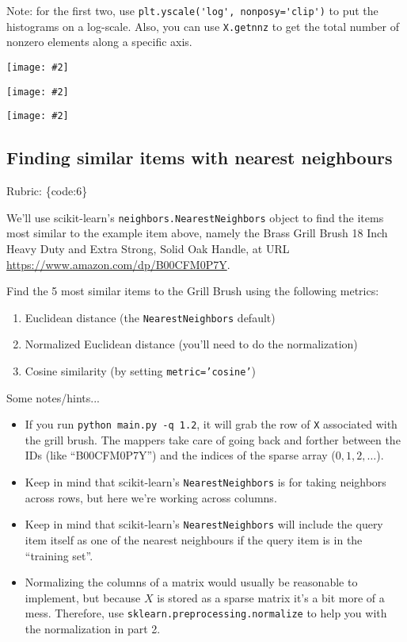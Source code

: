 \documentclass{article}
\def\rubric#1{\gre{Rubric: \{#1\}}}{}
\def\blu#1{{\color{blu}#1}}
\def\gre#1{{\color{gre}#1}}
\newcommand{\centerfig}[2]{\begin{center}\texttt{[image: \#2]}\end{center}}
\begin{document}
Note: for the first two, use \verb|plt.yscale('log', nonposy='clip')| to put the histograms on a log-scale. Also, you can use \verb|X.getnnz| to get the total number of nonzero elements along a specific axis.

\centerfig{0.8}{../figs/ratings_per_user.pdf}
\centerfig{0.8}{../figs/ratings_per_item.pdf}
\centerfig{0.8}{../figs/ratings.pdf}

\subsection{Finding similar items with nearest neighbours}
\rubric{code:6}

We'll use scikit-learn's \texttt{neighbors.NearestNeighbors} object to find the items most similar to the example item above, namely the Brass Grill Brush 18 Inch Heavy Duty and Extra Strong, Solid Oak Handle, at URL \url{https://www.amazon.com/dp/B00CFM0P7Y}.

\blu{Find the 5 most similar items to the Grill Brush using the following metrics:}

\begin{enumerate}
\item Euclidean distance (the \texttt{NearestNeighbors} default)
\item Normalized Euclidean distance (you'll need to do the normalization)
\item Cosine similarity (by setting \texttt{metric='cosine'})
\end{enumerate}

Some notes/hints...

\begin{itemize}
\item If you run \texttt{python main.py -q 1.2}, it will grab the row of \texttt{X} associated with the grill brush. The mappers take care of going back and forther between the IDs (like ``B00CFM0P7Y'') and the indices of the sparse array ($0,1,2,\ldots$).
\item Keep in mind that scikit-learn's \texttt{NearestNeighbors} is for taking neighbors across rows, but here we're working across columns.
\item Keep in mind that scikit-learn's \texttt{NearestNeighbors} will include the query item itself as one of the nearest neighbours if the query item is in the ``training set''.
\item Normalizing the columns of a matrix would usually be reasonable to implement, but because $X$ is stored as a sparse matrix it's a bit more of a mess. Therefore, use \texttt{sklearn.preprocessing.normalize} to help you with the normalization in part 2.
\end{itemize}
\end{document}
